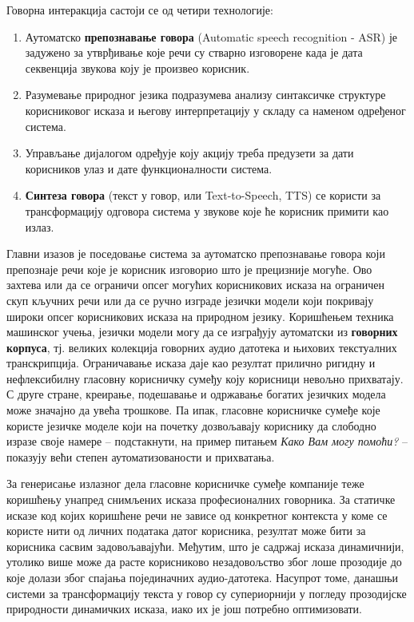 {\begin{multicols}{2}
Говорна интеракција састоји се од четири технологије: 
\begin{enumerate}
\item Аутоматско \textbf{препознавање говора} (Automatic speech recognition  - ASR) је задужено за утврђивање које речи су стварно изговорене када је дата секвенција звукова коју је произвео корисник. 
\item Разумевање природног језика подразумева  анализу синтаксичке структуре корисниковог исказа и његову интерпретацију у складу са наменом одређеног система.
\item Управљање дијалогом одређује коју акцију треба предузети за дати корисников улаз и дате функционалности система. 
\item \textbf{Синтеза говора} (текст у говор, или Text-to-Speech, TTS) се користи за трансформацију одговора система у звукове које ће корисник примити као излаз. 
\end{enumerate}
Главни изазов је поседовање система за аутоматско препознавање говора који препознаје речи које је корисник изговорио што је прецизније могуће. Ово захтева или да се ограничи опсег могућих корисникових исказа на ограничен скуп кључних речи или да се ручно изграде језички модели који покривају широки опсег корисникових исказа на природном језику. Коришћењем техника машинског учења, језички модели могу да се изграђују аутоматски из \textbf{говорних корпуса}, тј. великих колекција говорних аудио датотека и њихових текстуалних транскрипција. Ограничавање исказа даје као резултат прилично ригидну и нефлексибилну  гласовну корисничку сумеђу коју корисници невољно прихватају. С друге стране, креирање, подешавање и одржавање богатих језичких модела може значајно да увећа трошкове. Па ипак, гласовне корисничке сумеђе  које користе језичке моделе који на почетку дозвољавају кориснику да слободно изразе своје намере -- подстакнути, на пример питањем \textit{Како Вам могу помоћи?} -- показују већи степен аутоматизованости и прихватања. 


За генерисање излазног дела гласовне корисничке сумеђе компаније теже коришћењу унапред снимљених исказа професионалних говорника. За статичке исказе код којих коришћене речи не зависе од конкретног контекста у коме се користе нити од личних података датог корисника, резултат може бити за корисника сасвим задовољавајући. Међутим, што је садржај исказа динамичнији, утолико више може да расте корисниково незадовољство због лоше прозодије до које долази  због спајања појединачних аудио-датотека. Насупрот томе, данашњи системи за трансформацију текста у говор су супериорнији у погледу прозодијске природности динамичких исказа, иако их је још потребно оптимизовати. 


\end{multicols}}
